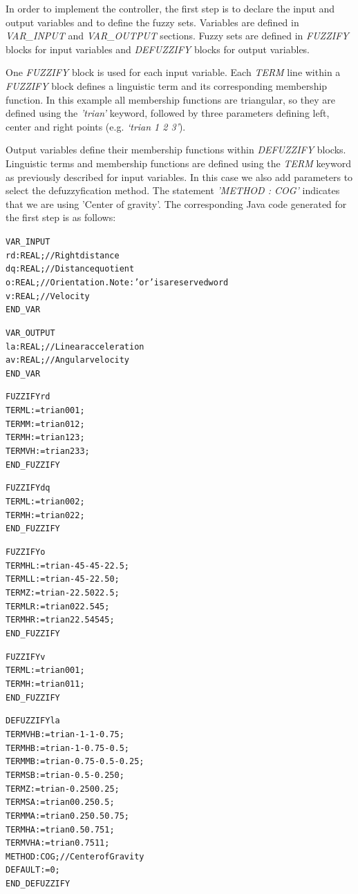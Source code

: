 \documentclass[11pt,twoside]{article}
\begin{document}
\begin{multicols}{2}
In order to implement the controller, the first step is to declare the input and output variables and to define the fuzzy sets. Variables are defined in \textit{VAR\_INPUT} and \textit{VAR\_OUTPUT} sections. Fuzzy sets are defined in \textit{FUZZIFY} blocks for input variables and \textit{DEFUZZIFY} blocks for output variables.

One \textit{FUZZIFY} block is used for each input variable. Each \textit{TERM} line within a \textit{FUZZIFY} block defines a linguistic term and its corresponding membership function.  In this example all membership functions are triangular, so they are defined using the \textit{'trian'} keyword, followed by three parameters defining left, center and right points (e.g. \textit{`trian 1 2 3'}).

Output variables define their membership functions within \textit{DEFUZZIFY} blocks. Linguistic terms and membership functions are defined using the \textit{TERM} keyword as previously described for input variables. In this case we also add parameters to select the defuzzyfication method. The statement \textit{'METHOD : COG'} indicates that we are using 'Center of gravity'. The corresponding Java code generated for the first step is as follows:

\vspace*{10pt}
\begin{scriptsize}
\begin{alltt}
VAR\_INPUT
	rd : REAL;			// Right distance
	dq : REAL;			// Distance quotient
	o  : REAL;			// Orientation. Note: 'or' is a reserved word
	v  : REAL;			// Velocity
END\_VAR

VAR\_OUTPUT
	la : REAL;			// Linear acceleration
	av : REAL;			// Angular velocity
END\_VAR

FUZZIFY rd
	TERM L  := trian 0 0 1;
	TERM M  := trian 0 1 2;
	TERM H  := trian 1 2 3;
	TERM VH := trian 2 3 3;
END\_FUZZIFY

FUZZIFY dq
	TERM L := trian 0 0 2;
	TERM H := trian 0 2 2;
END\_FUZZIFY

FUZZIFY o
	TERM HL := trian -45 -45 -22.5;
	TERM LL := trian -45 -22.5 0;
	TERM Z  := trian -22.5 0 22.5;
	TERM LR := trian 0 22.5 45;
	TERM HR := trian 22.5 45 45;
END\_FUZZIFY

FUZZIFY v
	TERM L := trian 0 0 1;
	TERM H := trian 0 1 1;
END\_FUZZIFY

DEFUZZIFY la
	TERM VHB := trian -1 -1 -0.75;
	TERM HB  := trian -1 -0.75 -0.5;
	TERM MB  := trian -0.75 -0.5 -0.25;
	TERM SB  := trian -0.5 -0.25 0;
	TERM Z   := trian -0.25 0 0.25;
	TERM SA  := trian 0 0.25 0.5;
	TERM MA  := trian 0.25 0.5 0.75;
	TERM HA  := trian 0.5 0.75 1;
	TERM VHA := trian 0.75 1 1;
	METHOD : COG;			// Center of Gravity
	DEFAULT := 0;
END\_DEFUZZIFY


\end{alltt}
\end{scriptsize}
\end{multicols}
\end{document}
